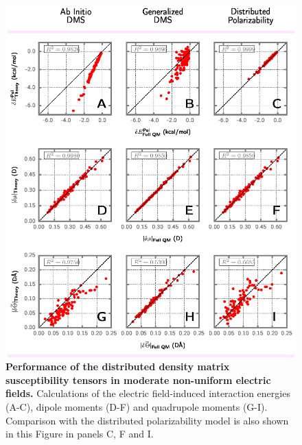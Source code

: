 \documentclass[aip,amsmath,amssymb,reprint,floatfix]{revtex4-1}
\begin{document}
\begin{figure}[h]
\includegraphics[width=\textwidth]{data/dmatpol/water/figure1/fig-2.eps}
\caption{\label{f:fig-2} {\bf Performance of the distributed density matrix susceptibility tensors in moderate
non\hyp{}uniform electric fields.}
Calculations of the electric field\hyp{}induced interaction energies (A-C), dipole moments (D-F) and
quadrupole moments (G-I). Comparison with the distributed polarizability model is also shown in this Figure
in panels C, F and I.}
\end{figure}
%
\end{document}
